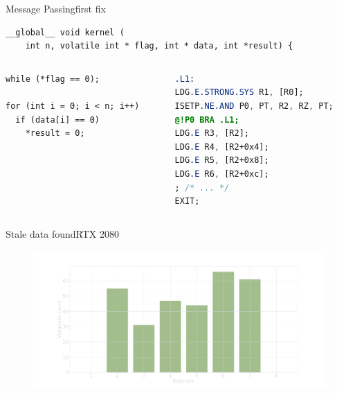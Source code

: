 \documentclass[aspectratio=169,compress]{beamer}
\begin{document}
\begin{frame}[fragile]{Message Passing}{first fix}
\centering
\begin{lstlisting}
__global__ void kernel (
    int n, volatile int * flag, int * data, int *result) { 
\end{lstlisting}

\begin{columns}[T]
	\begin{column}{0.45\textwidth}
\begin{lstlisting}[title={Reader}]
while (*flag == 0);

for (int i = 0; i < n; i++)
  if (data[i] == 0)
    *result = 0;
\end{lstlisting}
\end{column}

\begin{column}{0.45\textwidth}
\begin{lstlisting}[language={SASS},title={SASS}]
.L1:
LDG.E.STRONG.SYS R1, [R0];
ISETP.NE.AND P0, PT, R2, RZ, PT;
@!P0 BRA .L1;
LDG.E R3, [R2];
LDG.E R4, [R2+0x4];
LDG.E R5, [R2+0x8];
LDG.E R6, [R2+0xc];
; /* ... */
EXIT;
\end{lstlisting}
\end{column}
	\end{columns}
\end{frame}

\begin{frame}[fragile]{Stale data found}{RTX 2080}
\centering
	\begin{figure}
		\includegraphics[width=\textwidth]{mp_violations_hist.pdf}
	\end{figure}
\end{frame}
\end{document}
